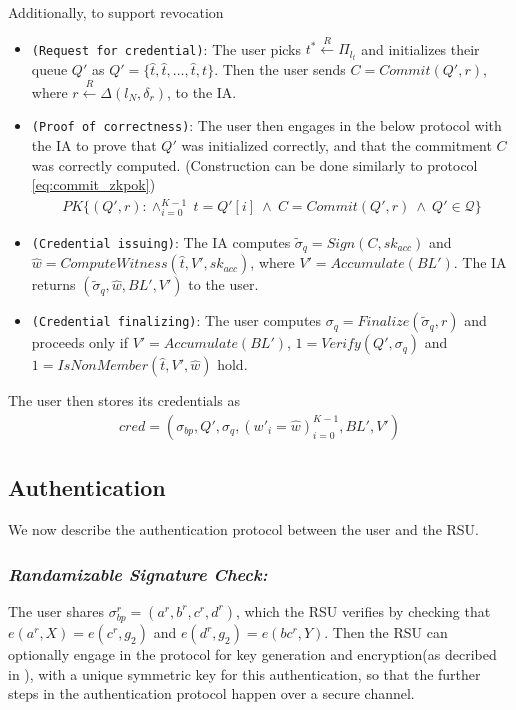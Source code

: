 \documentclass[12pt]{article}
\newcommand{\rIn}{\xleftarrow{R}}
\newcommand{\PK}[2]{\ensuremath{PK\{(#1): #2\}}}
\begin{document}
\noindent Additionally, to support revocation \vspace*{-3mm}
\begin{itemize}
	\item \texttt{(Request for credential)}: The user picks $t^* \rIn \Pi_{l_t}$ and initializes their queue $Q'$ as $Q' = \{ \hat{t}, \hat{t}, \dots, \hat{t}, t \}$. Then the user sends $C = Commit(Q', r)$, where $r \rIn \Delta(l_N, \delta_r)$, to the IA.
	\item \texttt{(Proof of correctness)}: The user then engages in the below protocol with the IA to prove that $Q'$ was initialized correctly, and that the commitment $C$ was correctly computed. (Construction can be done similarly to protocol \ref{eq:commit_zkpok})
	\begin{align}
		\PK{Q', r}{\land_{i=0}^{K-1}\ \hat{t} = Q'[i] \ \land\ C = Commit(Q', r) \ \land\ Q' \in \mathcal{Q}}
	\end{align}
	\item \texttt{(Credential issuing)}: The IA computes $\tilde{\sigma}_q = Sign(C, sk_{acc})$ and $\hat{w} = ComputeWitness(\hat{t}, V', sk_{acc})$, where $V' = Accumulate(BL')$.  The IA returns $(\tilde{\sigma}_q, \hat{w}, BL', V')$ to the user.
	\item \texttt{(Credential finalizing)}: The user computes $\sigma_q = Finalize(\tilde{\sigma}_q, r)$ and proceeds only if $V' = Accumulate(BL')$, $1 = Verify(Q', \sigma_q)$ and $1 = IsNonMember(\hat{t}, V', \hat{w})$ hold.
\end{itemize}

\noindent The user then stores its credentials as
\begin{align}
	cred = (\sigma_{bp}, Q', \sigma_q, (w'_i = \hat{w})_{i=0}^{K-1}, BL', V')
\end{align}


\subsection{Authentication}
We now describe the authentication protocol between the user and the RSU.

\subsubsection*{\textit{Randamizable Signature Check:}}\vspace*{-2mm}
The user shares $\sigma_{bp}^r = (a^r, b^r, c^r, d^r)$, which the RSU verifies by checking that $e(a^r, X) = e(c^r, g_2)$ and $e(d^r, g_2) = e(bc^r, Y)$. Then the RSU can optionally engage in the protocol for key generation and encryption(as decribed in \cite*{Kanchan}), with a unique symmetric key for this authentication, so that the further steps in the authentication protocol happen over a secure channel.\\
\end{document}
